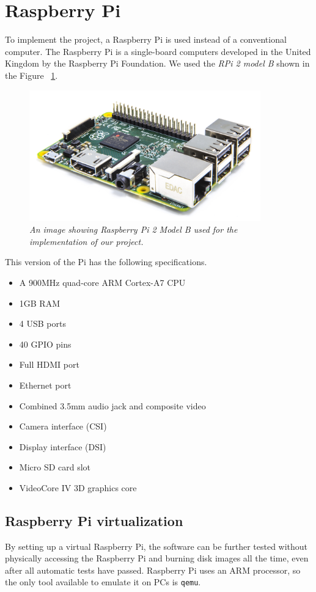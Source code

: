 \documentclass[a4paper, 12pt]{article}
\begin{document}
\newpage
\section{Raspberry Pi}
\label{sec:Rasberry_Pi}
To implement the project, a Raspberry Pi is used instead of a conventional computer. The Raspberry Pi is a single-board computers 
developed in the United Kingdom by the Raspberry Pi Foundation. We used the
\textit{RPi 2 model B} shown in the Figure ~\ref{fig:Pi2}.
\begin{figure}[ht]
\centering
\includegraphics[width=10.0cm]{Pi2.jpg}
\caption{\textit{An image showing Raspberry Pi 2 Model B used for the implementation of our project.}}
\label{fig:Pi2}
\end{figure}
This version of the Pi has the following specifications.
\begin{itemize}
  \item A 900MHz quad-core ARM Cortex-A7 CPU
  \item 1GB RAM
  \item 4 USB ports
  \item 40 GPIO pins
  \item Full HDMI port
  \item Ethernet port
  \item Combined 3.5mm audio jack and composite video
  \item Camera interface (CSI)
  \item Display interface (DSI)
  \item Micro SD card slot
  \item VideoCore IV 3D graphics core
\end{itemize}
\subsection{Raspberry Pi virtualization}
By setting up a virtual Raspberry Pi, the software can be further tested without physically accessing the Raspberry Pi and burning disk images all the time, even after all automatic tests have passed.
Raspberry Pi uses an ARM processor, so the only tool available to emulate it on PCs is \texttt{qemu}.
\end{document}
